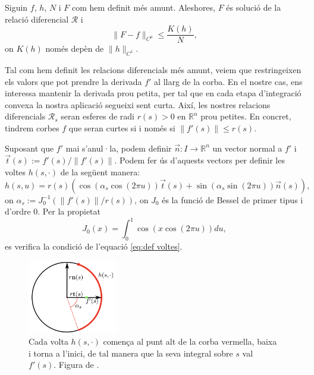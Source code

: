\begin{lema}\label{lema:C0-1D}
    Siguin $f$, $h$, $N$ i $F$ com hem definit més amunt. Aleshores, $F$ és solució de la relació diferencial $\mathcal R$ i 
    \begin{equation}
    \|F-f\|_{C^0} \le \frac{K(h)}{N},
    \end{equation}
    on $K(h)$ només depèn de $\|h\|_{C^1}$.
\end{lema}

Tal com hem definit les relacions diferencials més amunt, veiem que restringeixen els valors que pot prendre la derivada $f'$ al llarg de la corba. En el nostre cas, ens interessa mantenir la derivada prou petita, per tal que en cada etapa d'integració convexa la nostra aplicació segueixi sent curta. Així, les nostres relacions diferencials $\mathcal R_s$ seran esferes de radi $r(s)>0$ en $\mathbb R^n$ prou petites. En concret, tindrem corbes $f$ que seran curtes si i només si $\|f'(s)\|\le r(s)$.

Suposant que $f'$ mai s'anul·la, podem definir $\vec n:I\to\mathbb R^n$ un vector normal a $f'$ i $\vec t(s):=f'(s)/\|f'(s)\|$. Podem fer ús d'aquests vectors per definir les voltes $h(s, \cdot)$ de la següent manera:
\begin{equation*}
    h(s, u) = r(s)(\cos(\alpha_s\cos(2\pi u))\vec t(s) + \sin(\alpha_s\sin(2\pi u))\vec n(s)),
\end{equation*}
on $\alpha_s := J_0^{-1}(\|f'(s)\|/r(s))$, on $J_0$ és la funció de Bessel de primer tipus i d'ordre 0. Per la propietat
\begin{equation*}
    J_0(x) = \int_0^1 \cos(x\cos(2\pi u)) du,
\end{equation*}
es verifica la condició de l'equació \eqref{eq:def voltes}.

\begin{figure}[htbp]
    \centering
    \includegraphics[width=0.35\textwidth]{J0.png}
    \caption{Cada volta $h(s,\cdot)$ comença al punt alt de la corba vermella, baixa i torna a l'inici, de tal manera que la seva integral sobre $s$ val $f'(s)$. Figura de \citet{borrelli2013}.}
    \label{fig:sisena_foto}
\end{figure}

